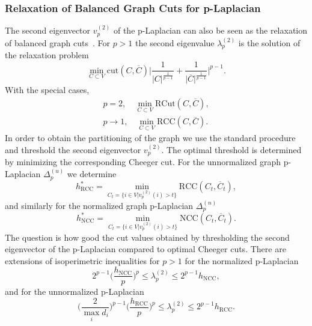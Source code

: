\subsubsection*{Relaxation of Balanced Graph Cuts for p-Laplacian}
The second eigenvector $v_p^{(2)}$ of the p-Laplacian can also be seen as the relaxation of balanced graph cuts~\cite{Buhler09}. For $p>1$ the second eigenvalue $\lambda_p^{(2)}$ is the solution of the relaxation problem
\begin{equation*}
 \min_{C\subset V} \mathrm{cut}(C, \overline{C}) \biggr\rvert \frac{1}{\rvert C\lvert^{\frac{1}{p-1}}} + \frac{1}{\rvert \overline{C}\lvert^{\frac{1}{p-1}}}\biggl\lvert^{p-1}.
\end{equation*}
With the special cases, 
\begin{equation*}
 \begin{aligned}
  p=2, \quad \min_{C\subset V} \mathrm{RCut}(C, \overline{C}),\\
  p\rightarrow 1, \quad \min_{C\subset V} \mathrm{RCC}(C, \overline{C}).
 \end{aligned}
\end{equation*}
In order to obtain the partitioning of the graph we use the standard procedure and threshold the second eigenvector $v_p^{(2)}$.  The optimal threshold is determined by minimizing the corresponding Cheeger cut.
For the unnormalized graph p-Laplacian $\Delta_{p}^{(u)}$ we determine 
\begin{equation}
 h_{\mathrm{RCC}}^* = \min_{C_t = \{i \in V | v_p^{(2)}(i) > t\}} \mathrm{RCC}(C_t, \overline{C}_t),
\end{equation}
and similarly for the normalized graph p-Laplacian $\Delta_{p}^{(n)}$ 
\begin{equation}
 h_{\mathrm{NCC}}^* = \min_{C_t = \{i \in V | v_p^{(2)}(i) > t\}} \mathrm{NCC}(C_t, \overline{C}_t).
\end{equation}
The question is how good the cut values obtained by thresholding the second eigenvector of the p-Laplacian compared to optimal Cheeger cuts. There are extensions of isoperimetric inequalities for $p>1$ for the normalized 
p-Laplacian~\cite{Amghibech03}
\begin{equation*}
 2^{p-1} \biggr ( \frac{h_{\mathrm{NCC}}}{p} \biggl )^p \leq \lambda_p^{(2)} \leq 2^{p-1} h_{\mathrm{NCC}},
\end{equation*}
 and for the unnormalized p-Laplacian~\cite{Buhler09}
 \begin{equation*}
 \biggr (\frac{2}{\max_i d_i} \biggl)^{p-1} \biggr ( \frac{h_{\mathrm{RCC}}}{p} \biggl)^p \leq \lambda_p^{(2)} \leq 2^{p-1} h_{\mathrm{RCC}}.
 \end{equation*}
